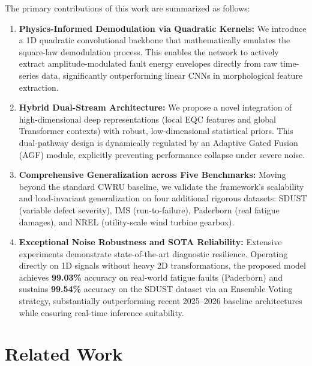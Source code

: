 \documentclass[5p,times,twocolumn]{elsarticle}
\begin{document}
The primary contributions of this work are summarized as follows:
\begin{enumerate}
    \item \textbf{Physics-Informed Demodulation via Quadratic Kernels:} We introduce a 1D quadratic convolutional backbone that mathematically emulates the square-law demodulation process. This enables the network to actively extract amplitude-modulated fault energy envelopes directly from raw time-series data, significantly outperforming linear CNNs in morphological feature extraction.
    
    \item \textbf{Hybrid Dual-Stream Architecture:} We propose a novel integration of high-dimensional deep representations (local EQC features and global Transformer contexts) with robust, low-dimensional statistical priors. This dual-pathway design is dynamically regulated by an Adaptive Gated Fusion (AGF) module, explicitly preventing performance collapse under severe noise.
    
    \item \textbf{Comprehensive Generalization across Five Benchmarks:} Moving beyond the standard CWRU baseline, we validate the framework's scalability and load-invariant generalization on four additional rigorous datasets: SDUST (variable defect severity), IMS (run-to-failure), Paderborn (real fatigue damages), and NREL (utility-scale wind turbine gearbox). 
    
    \item \textbf{Exceptional Noise Robustness and SOTA Reliability:} Extensive experiments demonstrate state-of-the-art diagnostic resilience. Operating directly on 1D signals without heavy 2D transformations, the proposed model achieves \textbf{99.03\%} accuracy on real-world fatigue faults (Paderborn) and sustains \textbf{99.54\%} accuracy on the SDUST dataset via an Ensemble Voting strategy, substantially outperforming recent 2025--2026 baseline architectures while ensuring real-time inference suitability.
\end{enumerate}

\section{Related Work}
\label{sec:related_work}
\end{document}
